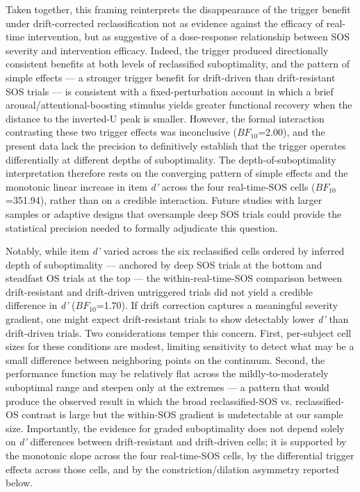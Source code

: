 Taken together, this framing reinterprets the disappearance of the trigger benefit under drift-corrected reclassification not as evidence against the efficacy of real-time intervention, but as suggestive of a dose-response relationship between SOS severity and intervention efficacy. Indeed, the trigger produced directionally consistent benefits at both levels of reclassified suboptimality, and the pattern of simple effects — a stronger trigger benefit for drift-driven than drift-resistant SOS trials — is consistent with a fixed-perturbation account in which a brief arousal/attentional-boosting stimulus yields greater functional recovery when the distance to the inverted-U peak is smaller. However, the formal interaction contrasting these two trigger effects was inconclusive ($BF_{10}$=2.00), and the present data lack the precision to definitively establish that the trigger operates differentially at different depths of suboptimality. The depth-of-suboptimality interpretation therefore rests on the converging pattern of simple effects and the monotonic linear increase in item \textit{d'} across the four real-time-SOS cells ($BF_{10}$=351.94), rather than on a credible interaction. Future studies with larger samples or adaptive designs that oversample deep SOS trials could provide the statistical precision needed to formally adjudicate this question.

Notably, while item \textit{d'} varied across the six reclassified cells ordered by inferred depth of suboptimality — anchored by deep SOS trials at the bottom and steadfast OS trials at the top — the within-real-time-SOS comparison between drift-resistant and drift-driven untriggered trials did not yield a credible difference in \textit{d'} ($BF_{10}$=1.70). If drift correction captures a meaningful severity gradient, one might expect drift-resistant trials to show detectably lower \textit{d'} than drift-driven trials. Two considerations temper this concern. First, per-subject cell sizes for these conditions are modest, limiting sensitivity to detect what may be a small difference between neighboring points on the continuum. Second, the performance function may be relatively flat across the mildly-to-moderately suboptimal range and steepen only at the extremes — a pattern that would produce the observed result in which the broad reclassified-SOS vs. reclassified-OS contrast is large but the within-SOS gradient is undetectable at our sample size. Importantly, the evidence for graded suboptimality does not depend solely on \textit{d'} differences between drift-resistant and drift-driven cells; it is supported by the monotonic slope across the four real-time-SOS cells, by the differential trigger effects across those cells, and by the constriction/dilation asymmetry reported below.

